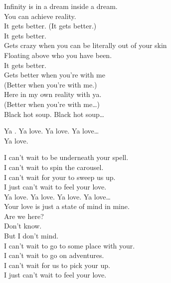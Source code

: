 Infinity is in a dream inside a dream. \\
You can achieve reality. \\
It gets better. (It gets better.) \\
It gets better. \\
Gets crazy when you can be literally out of your skin \\
Floating above who you have been. \\
It gets better. \\
Gets better when you're with me \\
(Better when you're with me.) \\
Here in my own reality with ya. \\
(Better when you're with me…) \\

Black hot soup. Black hot soup… \\





Ya . Ya love. Ya love. Ya love… \\

Ya love.

I can't wait to be underneath your spell. \\
I can't wait to spin the carousel. \\
I can't wait for your to sweep us up. \\
I just can't wait to feel your love. \\

Ya love. Ya love. Ya love. Ya love… \\

Your love is just a state of mind in mine. \\
Are we here? \\
Don't know. \\
But I don't mind. \\

I can't wait to go to some place with your. \\
I can't wait to go on adventures. \\
I can't wait for us to pick your up. \\
I just can't wait to feel your love. \\

